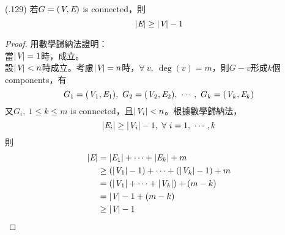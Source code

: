 \item \begin{theorem}{(.129)} 若$G = (\textit{V}, \textit{E})$ is connected，則\begin{equation}
        |\textit{E}| \ge |\textit{V}| - 1    
    \end{equation} \begin{proof}
        用數學歸納法證明： \\
        當$|\textit{V}| = 1$時，成立。 \\
        設$|\textit{V}| < n$時成立。考慮$|\textit{V}| = n$時，$\forall \ v, \ \deg(v) = m$，則$G - v$形成$k$個components，有\begin{equation}
            G_1 = (\V_1, \E_1), \ G_2 = (\V_2, \E_2), \ \cdots, \ G_k = (\V_k, \E_k)
        \end{equation} 又$G_i, \ 1 \le k \le m$ is connected，且$|\textit{V}_i| < n$。根據數學歸納法，\begin{equation}
            |\textit{E}_i| \ge |\textit{V}_i| - 1, \ \forall \ i = 1, \ \cdots, k
        \end{equation} 則 \begin{equation}
            \begin{aligned}
                |\textit{E}| & = |\textit{E}_1| + \cdots + |\textit{E}_k| + m \\
                & \ge (|\textit{V}_1| - 1) + \cdots + (|\textit{V}_k| - 1) + m \\
                & = (|\textit{V}_1| + \cdots + |\textit{V}_k|) + (m - k) \\
                & = |\textit{V}| - 1 + (m - k) \\
                & \ge |\textit{V}| - 1
            \end{aligned}
        \end{equation}
    \end{proof}
\end{theorem}

